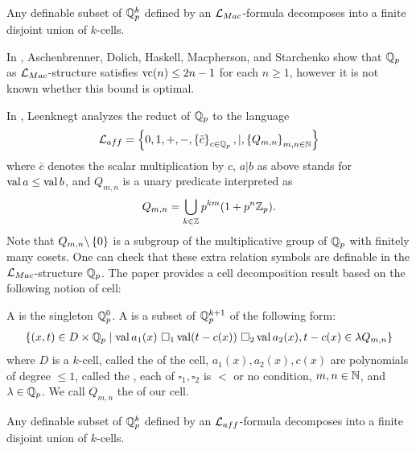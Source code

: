 \begin{Theorem} 
  Any definable subset of $\mathbb{Q}_p^k$ defined by an $\mathcal L_{Mac}$-formula decomposes into a finite disjoint union of $k$-cells.
\end{Theorem}  

In \cite{density}, Aschenbrenner, Dolich, Haskell, Macpherson, and Starchenko show that $\mathbb{Q}_p$ as $\mathcal L_{Mac}$-structure satisfies $\operatorname{vc}(n) \leq 2n - 1$
for each $n \geq 1$, however it is not known whether this bound is optimal.

In \cite{reduct}, Leenknegt analyzes the reduct of $\mathbb{Q}_p$ to the language
\begin{align*}
  \mathcal L_{aff}  = \left\{0, 1, +, -, \left\{\bar c\right\}_{c \in \mathbb{Q}_p}, |, \left\{Q_{m,n}\right\}_{m,n\in \mathbb{N}}\right\}
\end{align*}
where $\bar c$ denotes the scalar multiplication by $c$,
$a | b$ as above stands for $\operatorname{val} a \leq \operatorname{val} b$,
and $Q_{m,n}$ is a unary predicate interpreted as
\begin{align*}
  Q_{m,n} = \bigcup_{k \in \mathbb{Z}} p^{km} (1 + p^n\mathbb{Z}_p).
\end{align*}
Note that $Q_{m,n} \backslash \left\{0\right\}$ is a subgroup of the multiplicative group of $\mathbb{Q}_p$ with finitely many cosets.
One can check that these extra relation symbols are definable in the $\mathcal L_{Mac}$-structure $\mathbb{Q}_p$.
The paper \cite{reduct} provides a cell decomposition result based on the following notion of cell:

\begin{Definition} \label{cell}
  A  is the singleton $\mathbb{Q}_p^0$.
  A  is a subset of $\mathbb{Q}_p^{k+1}$ of the following form:
  \begin{align*}
    \left\{(x, t) \in D \times \mathbb{Q}_p \mid \operatorname{val} a_1(x) \ \square_1 \operatorname{val} (t - c(x)) \ \square_2 \operatorname{val} a_2(x), t - c(x) \in \lambda Q_{m,n} \right\}
  \end{align*}
  where $D$ is a $k$-cell, called the  of the cell,
  $a_1(x), a_2(x), c(x)$ are polynomials of degree $\leq 1$, called the ,
  each of $\square_1, \square_2$ is $<$ or no condition,
  $m,n \in \mathbb{N}$,
  and
  $\lambda  \in\mathbb{Q}_p$.
  We call $Q_{m,n}$ the  of our cell.
\end{Definition}

\begin{Theorem}[Leenknegt '12] \label{leen}
  Any definable subset of $\mathbb{Q}_p^k$ defined by an $\mathcal L_{aff}$-formula decomposes into a finite disjoint union of $k$-cells.
\end{Theorem}  

